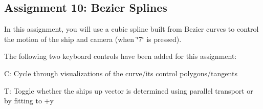 \subsection*{Assignment 10\+: Bezier Splines }

In this assignment, you will use a cubic spline built from Bezier curves to control the motion of the ship and camera (when \char`\"{}7\char`\"{} is pressed).

The following two keyboard controls have been added for this assignment\+:
\begin{DoxyItemize}
\item C\+: Cycle through visualizations of the curve/its control polygons/tangents
\item T\+: Toggle whether the ship\textquotesingle{}s up vector is determined using parallel transport or by fitting to +y 
\end{DoxyItemize}